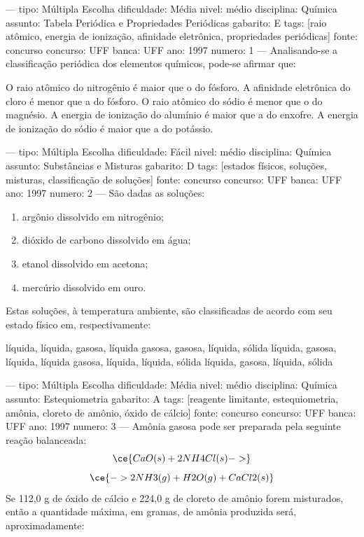 
---
tipo: Múltipla Escolha
dificuldade: Média
nivel: médio
disciplina: Química
assunto: Tabela Periódica e Propriedades Periódicas
gabarito: E
tags: [raio atômico, energia de ionização, afinidade eletrônica, propriedades periódicas]
fonte: concurso
concurso: UFF
banca: UFF
ano: 1997
numero: 1
---
\question
Analisando-se a classificação periódica dos elementos químicos, pode-se afirmar que:
\begin{choices}
\choice O raio atômico do nitrogênio é maior que o do fósforo.
\choice A afinidade eletrônica do cloro é menor que a do fósforo.
\choice O raio atômico do sódio é menor que o do magnésio.
\choice A energia de ionização do alumínio é maior que a do enxofre.
\CorrectChoice A energia de ionização do sódio é maior que a do potássio.
\end{choices}

---
tipo: Múltipla Escolha
dificuldade: Fácil
nivel: médio
disciplina: Química
assunto: Substâncias e Misturas
gabarito: D
tags: [estados físicos, soluções, misturas, classificação de soluções]
fonte: concurso
concurso: UFF
banca: UFF
ano: 1997
numero: 2
---
\question
São dadas as soluções:
\begin{enumerate}
\item argônio dissolvido em nitrogênio;
\item dióxido de carbono dissolvido em água;
\item etanol dissolvido em acetona;
\item mercúrio dissolvido em ouro.
\end{enumerate}
Estas soluções, à temperatura ambiente, são classificadas de acordo com seu estado físico em, respectivamente:
\begin{choices}
\choice líquida, líquida, gasosa, líquida
\choice gasosa, gasosa, líquida, sólida
\choice líquida, gasosa, líquida, líquida
\CorrectChoice gasosa, líquida, líquida, sólida
\choice líquida, gasosa, líquida, sólida
\end{choices}

---
tipo: Múltipla Escolha
dificuldade: Média
nivel: médio
disciplina: Química
assunto: Estequiometria
gabarito: A
tags: [reagente limitante, estequiometria, amônia, cloreto de amônio, óxido de cálcio]
fonte: concurso
concurso: UFF
banca: UFF
ano: 1997
numero: 3
---
\question
Amônia gasosa pode ser preparada pela seguinte reação balanceada:
$$\ce{CaO(s) + 2 NH4Cl(s) ->}$$
$$\ce{-> 2 NH3(g) + H2O(g) + CaCl2(s)}$$
Se 112,0 g de óxido de cálcio e 224,0 g de cloreto de amônio forem misturados, então a quantidade máxima, em gramas, de amônia produzida será, aproximadamente:

